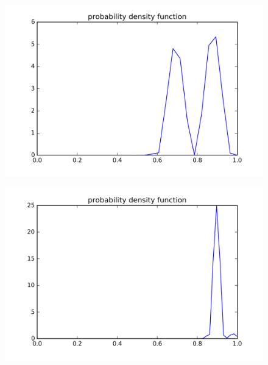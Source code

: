 \begin{figure}[!htbh]
\centering
\begin{minipage}{.45\textwidth}
  \centering
  \includegraphics[width=1.1\linewidth]{Harmonic_spring_ratio/densProb_0_5N_31m_2p_28th.png}
  \label{fig:spring_N_31m_2_28th}
\end{minipage}\qquad
\begin{minipage}{.45\textwidth}
  \centering
  \includegraphics[width=1.1\linewidth]{Harmonic_spring_ratio/densProb_0_5N_61m_2p_58th.png}
  \label{fig:spring_N_61m_2_58th}
\end{minipage}
\end{figure}


